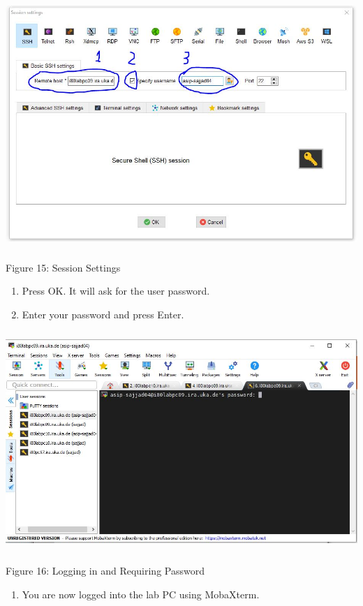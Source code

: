 \documentclass[
]{article}
\begin{document}
\includegraphics[width=5.53861in,height=3.70864in]{images/media/image15.JPG}

Figure 15: Session Settings

\begin{enumerate}
\def\labelenumi{\arabic{enumi}.}
\setcounter{enumi}{4}
\item
  Press OK. It will ask for the user password.
\item
  Enter your password and press Enter.
\end{enumerate}

\includegraphics[width=5.67963in,height=3.28535in]{images/media/image16.JPG}

Figure 16: Logging in and Requiring Password

\begin{enumerate}
\def\labelenumi{\arabic{enumi}.}
\setcounter{enumi}{6}
\item
  You are now logged into the lab PC using MobaXterm.
\end{enumerate}
\end{document}
